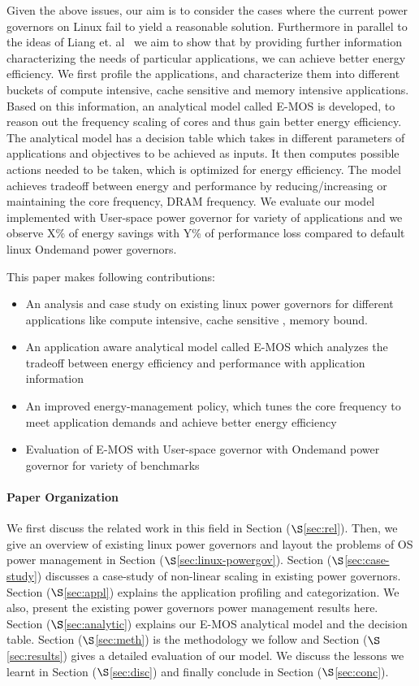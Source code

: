 Given the above issues, our aim is to consider the cases where the current power governors on Linux fail to yield a reasonable solution. Furthermore in parallel to the ideas of Liang et. al~\cite{and-dvfs} we aim to show that by providing further information characterizing the needs of particular applications, we can achieve better energy efficiency. We first profile the applications, and characterize them into different buckets of compute intensive, cache sensitive and memory intensive applications. Based on this information, an analytical model called E-MOS
is developed, to reason out the frequency scaling of 
cores and thus gain better energy efficiency. 
The analytical model has a decision table which takes in different parameters of applications and objectives to be achieved as inputs.
It then computes possible actions needed to be taken, which is optimized for energy efficiency.
The model achieves tradeoff between energy and performance 
by reducing/increasing or maintaining the core frequency, DRAM frequency. We evaluate our model implemented
with User-space power governor for variety of applications and we observe X\% of energy savings
with Y\% of performance loss compared to default linux Ondemand power governors.

This paper makes following contributions:
\begin{itemize}
\item  An analysis and case study on existing linux power governors for different applications like compute intensive, cache sensitive , memory bound. 
\item  An application aware analytical model called E-MOS which analyzes the tradeoff between energy efficiency and performance with application information
\item  An improved energy-management policy, which tunes the core frequency to meet application demands and achieve better energy efficiency 
\item  Evaluation of E-MOS with User-space governor with Ondemand power governor for variety of benchmarks
\end{itemize}

\paragraph{Paper Organization} 
We first discuss the related work in this field in Section ($\S$\ref{sec:rel}). 
Then, we give an overview of existing linux power governors and layout the problems of
OS power management in Section ($\S$\ref{sec:linux-powergov}). Section ($\S$\ref{sec:case-study})
discusses a case-study of non-linear scaling in existing power governors.
Section ($\S$\ref{sec:appl}) explains the application profiling and categorization. We also, present
the existing power governors power management results here. Section ($\S$\ref{sec:analytic}) explains
our E-MOS analytical model and the decision table. Section ($\S$\ref{sec:meth}) is the methodology we follow
and Section ($\S$\ref{sec:results}) gives a detailed evaluation of our model. We discuss the
lessons we learnt in Section ($\S$\ref{sec:disc}) and finally conclude in Section ($\S$\ref{sec:conc}).


